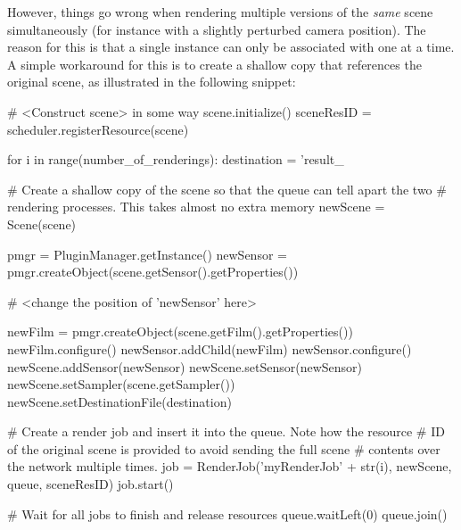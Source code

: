 However, things go wrong when rendering multiple versions of the \emph{same} scene simultaneously (for instance
with a slightly perturbed camera position). The reason for this is that a single  instance can only
be associated with one  at a time. A simple workaround for this is to create a shallow
copy that references the original scene, as illustrated in the following snippet:
\begin{python}
# <Construct scene> in some way
scene.initialize()
sceneResID = scheduler.registerResource(scene)

for i in range(number_of_renderings):
    destination = 'result_%

    # Create a shallow copy of the scene so that the queue can tell apart the two
    # rendering processes. This takes almost no extra memory
    newScene = Scene(scene)

    pmgr = PluginManager.getInstance()
    newSensor = pmgr.createObject(scene.getSensor().getProperties())

    # <change the position of 'newSensor' here>

    newFilm = pmgr.createObject(scene.getFilm().getProperties())
    newFilm.configure()
    newSensor.addChild(newFilm)
    newSensor.configure()
    newScene.addSensor(newSensor)
    newScene.setSensor(newSensor)
    newScene.setSampler(scene.getSampler())
    newScene.setDestinationFile(destination)

    # Create a render job and insert it into the queue. Note how the resource
    # ID of the original scene is provided to avoid sending the full scene
    # contents over the network multiple times.
    job = RenderJob('myRenderJob' + str(i), newScene, queue, sceneResID)
    job.start()

# Wait for all jobs to finish and release resources
queue.waitLeft(0)
queue.join()
\end{python}

